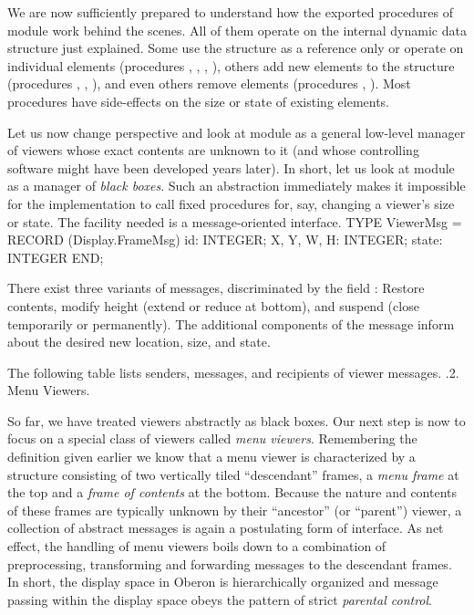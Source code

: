 We are now sufficiently prepared to understand how the exported
procedures of module  work behind the scenes. All of them
operate on the internal dynamic data structure just explained. Some
use the structure as a reference only or operate on individual
elements (procedures , , , ), others add new
elements to the structure (procedures , , ), and
even others remove elements (procedures , ). Most
procedures have side-effects on the size or state of existing
elements.

Let us now change perspective and look at module  as a general low-level manager of viewers whose exact contents are unknown to it (and whose controlling software might have been developed years later). In short, let us look at module  as a manager of \emph{black boxes}. Such an abstraction immediately makes it impossible for the implementation to call fixed procedures for, say, changing a viewer's size or state. The facility needed is a message-oriented interface.
\begintt
TYPE ViewerMsg = RECORD (Display.FrameMsg)
  id: INTEGER;
  X, Y, W, H: INTEGER;
  state: INTEGER
END;
\endtt

\noindent There exist three variants of  messages, discriminated by the
field : Restore contents, modify height (extend or reduce at
bottom), and suspend (close temporarily or permanently). The
additional components of the message inform about the desired new
location, size, and state.

The following table lists senders, messages, and recipients of viewer messages.
\medskip
{}
\medskip
{}.2. Menu Viewers.

So far, we have treated viewers abstractly as black boxes. Our next
step is now to focus on a special class of viewers called \emph{menu viewers}. Remembering the definition given earlier we know that a menu
viewer is characterized by a structure consisting of two vertically
tiled ``descendant'' frames, a \emph{menu frame} at the top and a \emph{frame of contents} at the bottom. Because the nature and contents of these
frames are typically unknown by their ``ancestor'' (or ``parent'') viewer,
a collection of abstract messages is again a postulating form of
interface. As net effect, the handling of menu viewers boils down to a
combination of preprocessing, transforming and forwarding messages to
the descendant frames. In short, the display space in Oberon is
hierarchically organized and message passing within the display space
obeys the pattern of strict \emph{parental control}.

